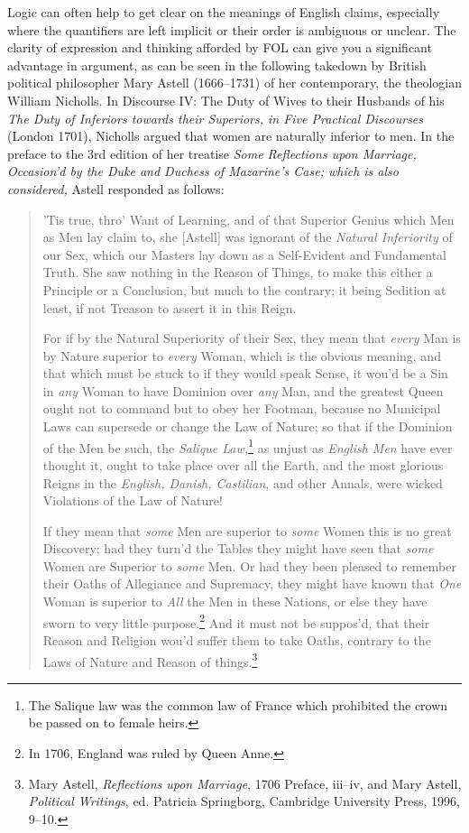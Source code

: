 Logic can often help to get clear on the meanings of English claims,
especially where the quantifiers are left implicit or their order is
ambiguous or unclear. The clarity of expression and thinking afforded
by FOL can give you a significant advantage in argument, as can be
seen in the following takedown by British political philosopher Mary
Astell (1666--1731) of her contemporary, the theologian William
Nicholls. In Discourse IV: The Duty of Wives to their Husbands of his
\textit{The Duty of Inferiors towards their Superiors, in Five
  Practical Discourses} (London 1701), Nicholls argued that women are
naturally inferior to men. In the preface to the 3rd edition of her
treatise \emph{Some Reflections upon Marriage, Occasion'd by the Duke
  and Duchess of Mazarine's Case; which is also considered,} Astell
responded as follows:
\begin{quotation}
'Tis true, thro' Want of Learning, and of that Superior Genius which
Men as Men lay claim to, she [Astell] was ignorant of the
\textit{Natural Inferiority} of our Sex, which our Masters lay down as
a Self-Evident and Fundamental Truth. She saw nothing in the Reason of
Things, to make this either a Principle or a Conclusion, but much to
the contrary; it being Sedition at least, if not Treason to assert it
in this Reign.

For if by the Natural Superiority of their Sex, they mean that
\textit{every} Man is by Nature superior to \textit{every} Woman,
which is the obvious meaning, and that which must be stuck to if they
would speak Sense, it wou'd be a Sin in \textit{any} Woman to have
Dominion over \textit{any} Man, and the greatest Queen ought not to
command but to obey her Footman, because no Municipal Laws can
supersede or change the Law of Nature; so that if the Dominion of the
Men be such, the \textit{Salique Law,}\footnote{The Salique law was
  the common law of France which prohibited the crown be passed on to
  female heirs.} as unjust as \textit{English Men} have ever thought
it, ought to take place over all the Earth, and the most glorious
Reigns in the \textit{English, Danish, Castilian}, and other Annals,
were wicked Violations of the Law of Nature!

If they mean that \textit{some} Men are superior to \textit{some}
Women this is no great Discovery; had they turn'd the Tables they
might have seen that \textit{some} Women are Superior to \textit{some}
Men. Or had they been pleased to remember their Oaths of Allegiance
and Supremacy, they might have known that \textit{One} Woman is
superior to \textit{All} the Men in these Nations, or else they have
sworn to very little purpose.\footnote{In 1706, England was ruled by
  Queen Anne.} And it must not be suppos'd, that their Reason and
Religion wou'd suffer them to take Oaths, contrary to the Laws of
Nature and Reason of things.\footnote{Mary Astell, \textit{Reflections
    upon Marriage}, 1706 Preface, iii--iv, and Mary Astell,
  \textit{Political Writings}, ed. Patricia Springborg, Cambridge
  University Press, 1996, 9--10.}
\end{quotation}
